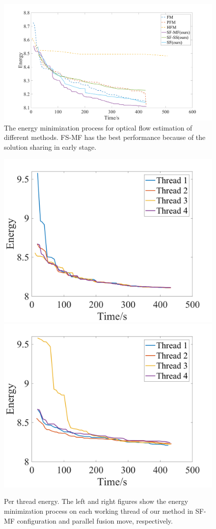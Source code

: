 
\begin{figure}[tb]
  \includegraphics[width=\columnwidth]{figure/optical_flow_convergence.png}
  \caption{The energy minimization process for optical flow estimation of different methods. FS-MF has the best performance because of the solution sharing in early stage.}\label{fig:optical_flow_convergence}
\end{figure}
\begin{figure}[tb]
  \includegraphics[width=0.5\columnwidth]{figure/optical_flow_SF_MF_threads.png}
  \includegraphics[width=0.5\columnwidth]{figure/optical_flow_PFM_threads.png}
  \caption{Per thread energy. The left and right figures show the energy minimization process on each working thread of our method in SF-MF configuration and parallel fusion move, respectively.}\label{fig:optical_flow_by_threads}
\end{figure}
